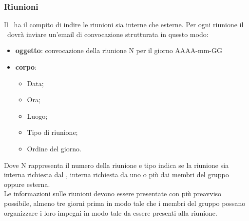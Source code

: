 \documentclass[../NormeProgetto.tex]{subfiles}
\begin{document}
		\subsubsection{Riunioni}
			Il \responsabilediprogetto\ ha il compito di indire le riunioni sia interne che esterne. Per ogni riunione il \responsabilediprogetto\ dovrà inviare un'email di convocazione strutturata in questo modo:
			\begin{itemize}
			\item \textbf{oggetto}: convocazione della riunione N per il giorno AAAA-mm-GG
			\item \textbf{corpo}: 
			\begin{itemize}
			\item Data;
			\item Ora;
			\item Luogo;
			\item Tipo di riunione;
			\item Ordine del giorno.
			\end{itemize}
			\end{itemize}
			Dove N rappresenta il numero della riunione e tipo indica se la riunione sia interna richiesta dal \responsabilediprogetto, interna richiesta da uno o più dai membri del gruppo oppure esterna. \\
			Le informazioni sulle riunioni devono essere presentate con più preavviso possibile, almeno tre giorni prima in modo tale che i membri del gruppo possano organizzare i loro impegni in modo tale da essere presenti alla riunione.
\end{document}

